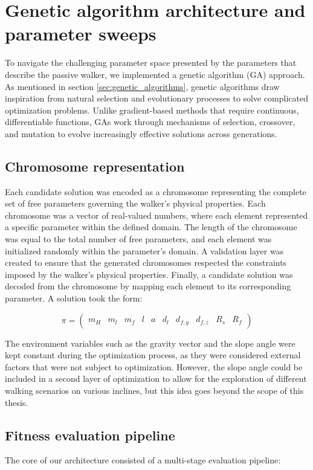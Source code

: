 \section{Genetic algorithm architecture and parameter sweeps}
To navigate the challenging parameter space presented by the parameters that describe the passive walker, we implemented a genetic algorithm (GA) approach. 
As mentioned in section \ref{sec:genetic_algorithms}, genetic algorithms draw inspiration from natural selection and evolutionary processes to solve complicated optimization problems.
Unlike gradient-based methods that require continuous, differentiable functions, GAs work through mechanisms of selection, crossover, and mutation to evolve increasingly effective solutions across generations.

\subsection{Chromosome representation}
Each candidate solution was encoded as a chromosome representing the complete set of free parameters governing the walker's physical properties.
Each chromosome was a vector of real-valued numbers, where each element represented a specific parameter within the defined domain.
The length of the chromosome was equal to the total number of free parameters, and each element was initialized randomly within the parameter's domain.
A validation layer was created to ensure that the generated chromosomes respected the constraints imposed by the walker's physical properties.
Finally, a candidate solution was decoded from the chromosome by mapping each element to its corresponding parameter.
A solution took the form:

\[
    \pi = 
    \begin{pmatrix}
        m_H & m_l & m_f & l & a & d_l & d_{f,y} & d_{f,z} & R_s & R_f
    \end{pmatrix}
\]

The environment variables such as the gravity vector and the slope angle were kept constant during the optimization process, as they were considered external factors that were not subject to optimization.
However, the slope angle could be included in a second layer of optimization to allow for the exploration of different walking scenarios on various inclines, but this idea goes beyond the scope of this thesis.

\subsection{Fitness evaluation pipeline}
The core of our architecture consisted of a multi-stage evaluation pipeline:

